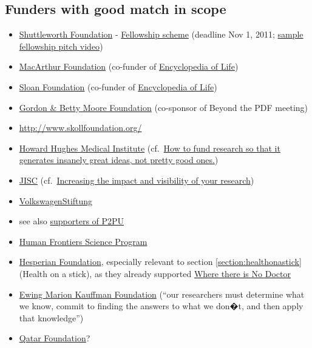 \documentclass[final,authoryear,3p]{elsarticle-open-drafting}
\begin{document}
\subsection{Funders with good match in scope}
\begin{itemize}
	\item \href{http://www.shuttleworthfoundation.org/}{Shuttleworth Foundation} - \href{http://www.shuttleworthfoundation.org/funding/fellowship-programme/}{Fellowship scheme} (deadline Nov 1, 2011; \href{http://vimeo.com/10401282}{sample fellowship pitch video})
	\item \href{http://www.macfound.org}{MacArthur Foundation} (co-funder of \href{http://www.eol.org/}{Encyclopedia of Life})
	\item \href{http://www.sloan.org/}{Sloan Foundation} (co-funder of \href{http://www.eol.org/}{Encyclopedia of Life})
	\item \href{http://www.moore.org/}{Gordon \& Betty Moore Foundation} (co-sponsor of Beyond the PDF meeting)
	\item \href{http://www.skollfoundation.org/}{http://www.skollfoundation.org/}
	\item \href{http://www.hhmi.org/}{Howard Hughes Medical Institute} (cf.\ \href{http://www.slate.com/id/2293699/pagenum/all/#p2}{How to fund research so that it generates insanely great ideas, not pretty good ones.})
	\item \href{http://www.jisc.ac.uk}{JISC} (cf.\  \href{http://www.jisc.ac.uk/supportingyourinstitution/researchexcellence/researchvisibility.aspx}{Increasing the impact and visibility of your research})
	\item \href{http://www.volkswagen-stiftung.de/}{VolkswagenStiftung}
	\item see also \href{http://p2pu.org/general/supporters}{supporters of P2PU}
	\item \href{http://www.hfsp.org/}{Human Frontiers Science Program}
	\item \href{http://www.hesperian.org/publications_download.php}{Hesperian Foundation}, especially relevant to section \ref{section:healthonastick} (Health on a stick), as they already supported \href{http://site.ebrary.com/lib/hesperian/docDetail.action?docID=10411911}{Where there is No Doctor}
	\item \href{http://www.kauffman.org/about-foundation/foundation-overview.aspx}{Ewing Marion Kauffman Foundation} (``our researchers must determine what we know, commit to finding the answers to what we don�t, and then apply that knowledge'')
	\item \href{http://www.qf.org.qa/}{Qatar Foundation}?
\end{itemize}
\end{document}
